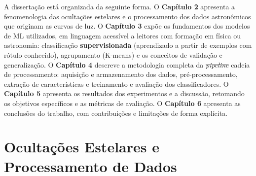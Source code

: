 \documentclass[msc]{on} %
\makeatletter
\providecommand{\DIFaddtex}[1]{{\protect\color{red}#1}} %
\providecommand{\DIFdeltex}[1]{{\protect\color{red}\sout{#1}}} %
\providecommand{\DIFaddbegin}{} %
\providecommand{\DIFaddend}{} %
\providecommand{\DIFdelbegin}{} %
\providecommand{\DIFdelend}{} %
\providecommand{\DIFadd}[1]{\texorpdfstring{\DIFaddtex{#1}}{#1}} %
\providecommand{\DIFdel}[1]{\texorpdfstring{\DIFdeltex{#1}}{}} %
\let\sout@orig\sout %
\renewcommand{\sout}[1]{\ifmmode\text{\sout@orig{\ensuremath{#1}}}\else\sout@orig{#1}\fi} %
\makeatother
\begin{document}
A dissertação está organizada da seguinte forma. O \textbf{Capítulo 2} apresenta a fenomenologia das ocultações estelares e o processamento dos dados astronômicos que originam as curvas de luz. O \textbf{Capítulo 3} expõe os fundamentos dos modelos de ML utilizados, em linguagem acessível a leitores com formação em física ou astronomia: classificação \textbf{supervisionada} (aprendizado a partir de exemplos com rótulo conhecido), agrupamento (K-means) e os conceitos de validação e generalização. O \textbf{Capítulo 4} descreve a metodologia completa da \DIFdelbegin \textit{\DIFdel{pipeline}}%
\DIFdelend\ifhmode\hskip0pt\fi \DIFaddbegin \DIFadd{cadeia de processamento}\DIFaddend : aquisição e armazenamento dos dados, pré-processamento, extração de características e treinamento e avaliação dos classificadores. O \textbf{Capítulo 5} apresenta os resultados dos experimentos e a discussão, retomando os objetivos específicos e as métricas de avaliação. O \textbf{Capítulo 6} apresenta as conclusões do trabalho, com contribuições e limitações de forma explícita.


\chapter{Ocultações Estelares e Processamento de Dados}

\end{document}
